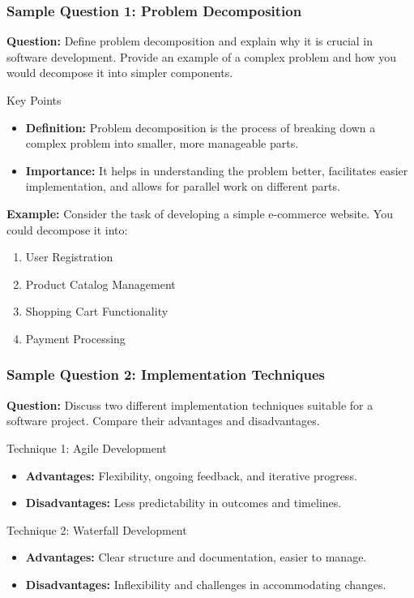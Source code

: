 \documentclass[aspectratio=169]{beamer}
\begin{document}
\begin{frame}[fragile]
    \frametitle{Sample Question 1: Problem Decomposition}
    \textbf{Question:} Define problem decomposition and explain why it is crucial in software development. Provide an example of a complex problem and how you would decompose it into simpler components.
    
    \begin{block}{Key Points}
        \begin{itemize}
            \item \textbf{Definition:} Problem decomposition is the process of breaking down a complex problem into smaller, more manageable parts.
            \item \textbf{Importance:} It helps in understanding the problem better, facilitates easier implementation, and allows for parallel work on different parts.
        \end{itemize}
    \end{block}
    
    \textbf{Example:} Consider the task of developing a simple e-commerce website. You could decompose it into:
    \begin{enumerate}
        \item User Registration
        \item Product Catalog Management
        \item Shopping Cart Functionality
        \item Payment Processing
    \end{enumerate}
\end{frame}

\begin{frame}[fragile]
    \frametitle{Sample Question 2: Implementation Techniques}
    \textbf{Question:} Discuss two different implementation techniques suitable for a software project. Compare their advantages and disadvantages.

    \begin{block}{Technique 1: Agile Development}
        \begin{itemize}
            \item \textbf{Advantages:} Flexibility, ongoing feedback, and iterative progress.
            \item \textbf{Disadvantages:} Less predictability in outcomes and timelines.
        \end{itemize}
    \end{block}
    
    \begin{block}{Technique 2: Waterfall Development}
        \begin{itemize}
            \item \textbf{Advantages:} Clear structure and documentation, easier to manage.
            \item \textbf{Disadvantages:} Inflexibility and challenges in accommodating changes.
        \end{itemize}
    \end{block}
\end{frame}
\end{document}
